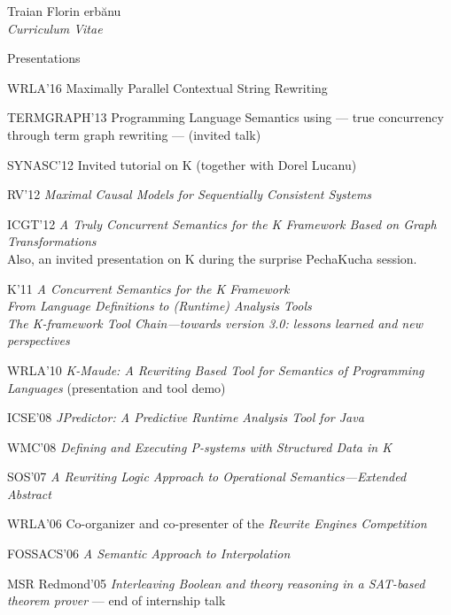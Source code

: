 \documentclass[10pt]{article}
\newcommand{\Sh}{\unichar{0536}}
\newcommand{\tz}{\unichar{0539}}
\newcommand{\Serbanuta}{{\Sh}er\-b{\u a}\-nu\-{\tz}{\u a}}
\begin{document}
\begin{cv}{Traian Florin \Serbanuta{}\\{\large \itshape Curriculum Vitae}}
\begin{cvlist}{Presentations}
\item[WRLA'16] Maximally Parallel Contextual String Rewriting
\item[TERMGRAPH'13] Programming Language Semantics using --- true concurrency through term graph rewriting --- (invited talk)
\item[SYNASC'12] Invited tutorial on K (together with Dorel Lucanu)
\item[RV'12]  \textit{Maximal Causal Models for Sequentially Consistent Systems}
\item[ICGT'12] \textit{A Truly Concurrent Semantics for the K Framework Based on
               Graph Transformations}
               \\
               Also, an invited presentation on K during the surprise PechaKucha session.
\item[K'11] \textit{A Concurrent Semantics for the K Framework}
\\ \textit{From Language Definitions to (Runtime) Analysis Tools}
\\ \textit{The K-framework Tool Chain---towards version 3.0: lessons learned and new perspectives}
\item[WRLA'10] \textit{K-Maude: A Rewriting Based Tool for Semantics of Programming Languages} (presentation and tool demo)
\item[ICSE'08] \textit{JPredictor: A Predictive Runtime Analysis Tool for Java}
\item[WMC'08] \textit{Deﬁning and Executing P-systems with Structured Data in K}
\item[SOS'07] \textit{A Rewriting Logic Approach to Operational Semantics---Extended Abstract}
\item[WRLA'06] Co-organizer and co-presenter of the \textit{Rewrite Engines Competition}
\item[FOSSACS'06] \textit{A Semantic Approach to Interpolation}
\item[MSR Redmond'05] \textit{Interleaving Boolean and theory reasoning in a SAT-based theorem prover} --- end of internship talk
\end{cvlist}

\setlength{\cvlabelwidth}{1em}

%


\end{cv}
\end{document}
